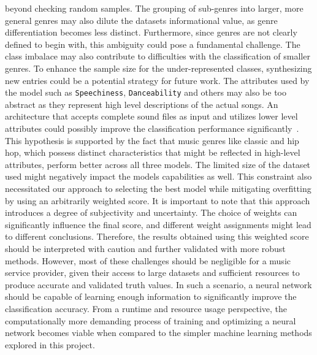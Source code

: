 \documentclass[
  12pt,
  bibliography=totoc,     %
  captions=tableheading,  %
  titlepage=firstiscover, %
]{scrartcl}
\begin{document}
beyond checking random samples.
The grouping of sub-genres into larger, more general genres may also dilute the datasets informational value, as genre differentiation becomes less distinct.
Furthermore, since genres are not clearly defined to begin with, this ambiguity could pose a fundamental challenge.
The class imbalace may also contribute to difficulties with the classification of smaller genres.
To enhance the sample size for the under-represented classes, synthesizing new entries could be a potential strategy for future work.
The attributes used by the model such as \texttt{Speechiness}, \texttt{Danceability} and others may also be too abstract as they represent high level descriptions
of the actual songs. An architecture that accepts complete sound files as input and utilizes lower level attributes could possibly improve the classification
performance significantly~\cite{Übersicht2011}. This hypothesis is supported by the fact that music genres like classic and hip hop, which possess distinct
characteristics that might be reflected in high-level attributes, perform better across all three models.
The limited size of the dataset used might negatively impact the models capabilities as well. This constraint also necessitated our approach to selecting the best model while
mitigating overfitting by using an arbitrarily weighted score. It is important to note that this approach introduces a degree of subjectivity and uncertainty. The choice of
weights can significantly influence the final score, and different weight assignments might lead to different conclusions. Therefore, the results obtained using this weighted
score should be interpreted with caution and further validated with more robust methods.
However, most of these challenges should be negligible for a music service provider, given their access to large datasets and sufficient resources to produce accurate and
validated truth values. In such a scenario, a neural network should be capable of learning enough information to significantly improve the classification accuracy. From a
runtime and resource usage perspective, the computationally more demanding process of training and optimizing a neural network becomes viable when compared to the simpler
machine learning methods explored in this project.

\newpage
\printbibliography
\end{document}
